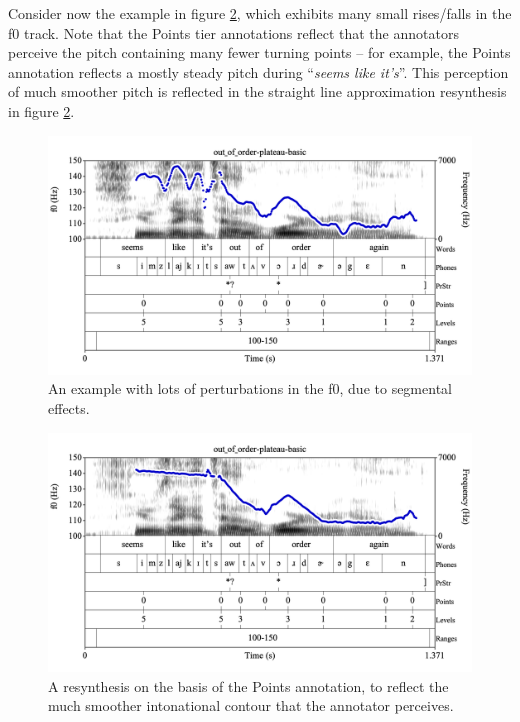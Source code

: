 \documentclass[11pt, twoside]{memoir}
\def\langtext#1{\textit{#1}}
\begin{document}
Consider now the example in figure \ref{fig:out of order-plateau f0-tracking}, which exhibits many small rises\slash falls in the f0 track. Note that the Points tier annotations reflect that the annotators perceive the pitch containing many fewer turning points – for example, the Points annotation reflects a mostly steady pitch during “\langtext{seems like it’s}”. This perception of much smoother pitch is reflected in the straight line approximation resynthesis in figure \ref{fig:out of order-plateau f0-tracking}.
\begin{figure}[H]
\centering
\includegraphics[width=.875\linewidth]{Appendix-out_of_order-plateau}
\caption{An example with lots of perturbations in the f0, due to segmental effects.
\label{fig:out of order-plateau f0-tracking}
}
\end{figure}
\begin{figure}[H]
\centering
\includegraphics[width=.875\linewidth]{Appendix-out_of_order-plateau-resynth}
\caption{A resynthesis on the basis of the Points annotation, to reflect the much smoother intonational contour that the annotator perceives.
\label{fig:out of order-plateau f0-tracking}
}
\end{figure}
\end{document}
